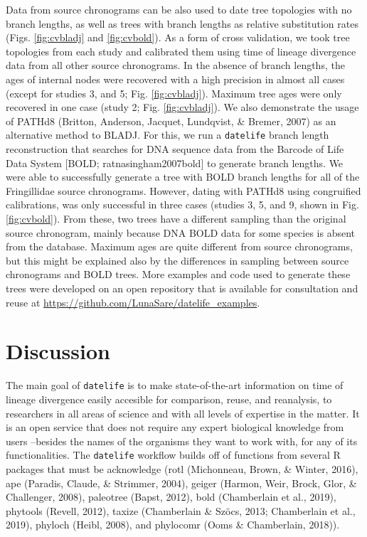 \documentclass[
  english,
  man]{apa6}
\begin{document}
Data from source chronograms can be also used to date tree topologies with no branch lengths, as well as trees with branch lengths as relative substitution rates (Figs. \ref{fig:cvbladj} and \ref{fig:cvbold}). As a form of cross validation, we took tree topologies from each study and calibrated them using time of lineage divergence data from all other source chronograms. In the absence of branch lengths, the ages of internal nodes were recovered with a high precision in almost all cases (except for studies 3, and 5; Fig. \ref{fig:cvbladj}).
Maximum tree ages were only recovered in one case (study 2; Fig. \ref{fig:cvbladj}).
We also demonstrate the usage of PATHd8 (Britton, Anderson, Jacquet, Lundqvist, \& Bremer, 2007) as an alternative method to BLADJ. For this, we run a \texttt{datelife} branch length reconstruction that searches for DNA sequence data from the Barcode of Life Data System {[}BOLD; ratnasingham2007bold{]} to generate branch lengths. We were able to successfully generate a tree with BOLD branch lengths for all of the Fringillidae source chronograms. However, dating with PATHd8 using congruified calibrations, was only successful in
three cases (studies 3, 5, and 9, shown in Fig. \ref{fig:cvbold}). From these, two trees have a different sampling than the original source chronogram, mainly because DNA BOLD data for some species is absent from the database. Maximum ages are quite different from source chronograms, but this might be explained also by the differences in sampling between source chronograms and BOLD trees.
More examples and code used to generate these trees were developed on an open repository that is available for consultation and reuse at \url{https://github.com/LunaSare/datelife_examples}.

\hypertarget{discussion}{%
\section{Discussion}\label{discussion}}

The main goal of \texttt{datelife} is to make state-of-the-art information on time of lineage divergence easily accesible for comparison, reuse, and reanalysis, to researchers in all areas of science and with all levels of expertise in the matter. It is an open service that does not require any expert biological knowledge from users --besides the names of the organisms they want to work with, for any of its functionalities.
The \texttt{datelife} workflow builds off of functions from several R packages that must be acknowledge (rotl (Michonneau, Brown, \& Winter, 2016), ape (Paradis, Claude, \& Strimmer, 2004),
geiger (Harmon, Weir, Brock, Glor, \& Challenger, 2008), paleotree (Bapst, 2012), bold (Chamberlain et al., 2019), phytools (Revell, 2012), taxize (Chamberlain \& Szöcs, 2013; Chamberlain et al., 2019), phyloch (Heibl, 2008), and phylocomr (Ooms \& Chamberlain, 2018)).
\end{document}
